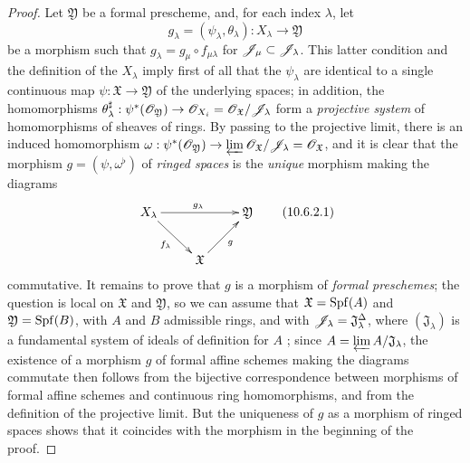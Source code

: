 \begin{proof}
Let $\mathfrak{Y}$ be a formal prescheme, and, for each index $\lambda$, let
\[
  g_\lambda=(\psi_\lambda,\theta_\lambda):X_\lambda\to\mathfrak{Y}
\]
be a morphism such that $g_\lambda=g_\mu\circ f_{\mu\lambda}$ for $\mathscr{J}_\mu\subset\mathscr{J}_\lambda$.
This latter condition and the definition of the $X_\lambda$ imply first of all that the $\psi_\lambda$ are identical to a single continuous map $\psi:\mathfrak{X}\to\mathfrak{Y}$ of the underlying spaces; in addition, the homomorphisms $\theta_\lambda^\sharp:\psi^*(\sh{O}_\mathfrak{Y})\to\sh{O}_{X_i}=\sh{O}_\mathfrak{X}/\sh{J}_\lambda$ form a \emph{projective system} of homomorphisms of sheaves of rings.
By passing to the projective limit, there is an induced homomorphism $\omega:\psi^*(\sh{O}_\mathfrak{Y})\to\varprojlim\sh{O}_\mathfrak{X}/\sh{J}_\lambda=\sh{O}_\mathfrak{X}$, and it is clear that the morphism $g=(\psi,\omega^\flat)$ of \emph{ringed spaces} is the \emph{unique} morphism making the diagrams
\[
\label{I.10.6.2.1}
  \xymatrix{
    X_\lambda\ar[rr]^{g_\lambda}\ar[rd]_{f_\lambda} & &
    \mathfrak{Y}\\
    & \mathfrak{X}\ar[ru]_g
  }
  \tag{10.6.2.1}
\]
commutative.
It remains to prove that $g$ is a morphism of \emph{formal preschemes}; the question is local on $\mathfrak{X}$ and $\mathfrak{Y}$, so we can assume that $\mathfrak{X}=\operatorname{Spf}(A)$ and $\mathfrak{Y}=\operatorname{Spf}(B)$, with $A$ and $B$ admissible rings, and with $\mathscr{J}_\lambda=\mathfrak{J}_\lambda^\Delta$, where $(\mathfrak{J}_\lambda)$ is a fundamental system of ideals of definition for $A$ ; since $A=\varprojlim A/\mathfrak{J}_\lambda$, the existence of a morphism $g$ of formal affine schemes making the diagrams  commutate then follows from the bijective correspondence  between morphisms of formal affine schemes and continuous ring homomorphisms, and from the definition of the projective limit.
But the uniqueness of $g$ as a morphism of ringed spaces shows that it coincides with the morphism in the beginning of the proof.
\end{proof}

